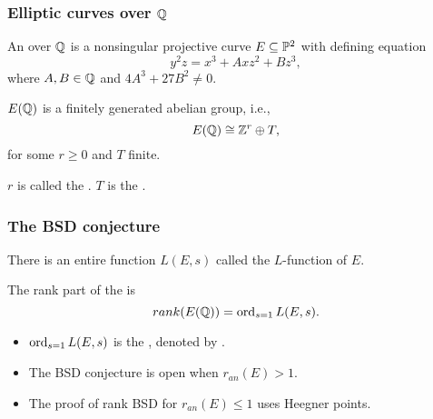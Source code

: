\documentclass[handout]{beamer}
\begin{document}
\begin{frame}
\frametitle{Elliptic curves over $\mathbb{Q}$}
\begin{Def}
An  over $\mathbb{Q}$ is a nonsingular projective curve $E \subseteq \mathbb{P}^2$ with defining equation 
\begin{equation*}
y^2z = x^3 + Axz^2+Bz^3, 
\end{equation*}
where $A,B \in \mathbb{Q}$ and  $4A^3+27B^2 \neq 0$.
\end{Def}



\pause

\begin{theorem}
$E(\mathbb{Q})$ is a finitely generated abelian group, i.e., $$E(\mathbb{Q}) \cong \mathbb{Z}^r \oplus T,$$
for some $r \geq 0$ and $T$ finite. 
\end{theorem}
$r$ is called the . $T$ is the . 

\end{frame}



\begin{frame}
\frametitle{The BSD conjecture} 


There is an entire function $L(E,s)$ called the $L$-function of $E$.  \\

\medskip
\pause

The rank part of the   is
\begin{equation*}
	rank(E(\mathbb{Q})) = \operatorname{ord}_{s=1}L(E,s).
\end{equation*}

\pause
\medskip

\begin{itemize}
\item $\operatorname{ord}_{s=1}L(E,s)$ is the , denoted by . \\
\item The BSD conjecture is open when $r_{an}(E) > 1$. \\
\item The proof of rank BSD for $r_{an}(E) \leq 1$ uses Heegner points. 
\end{itemize}

\end{frame}
\end{document}
